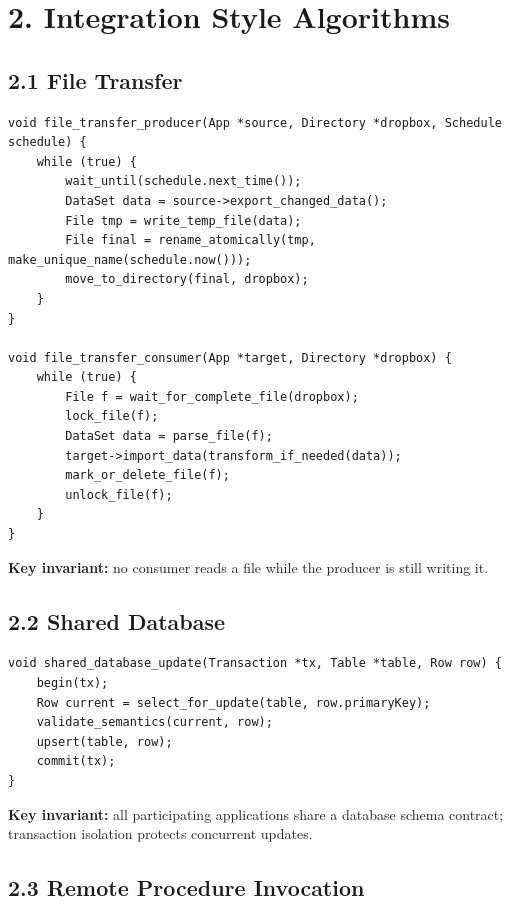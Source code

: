 \documentclass[11pt]{article}
\begin{document}
\section{2. Integration Style
Algorithms}\label{integration-style-algorithms}

\subsection{2.1 File Transfer}\label{file-transfer}

\begin{verbatim}
void file_transfer_producer(App *source, Directory *dropbox, Schedule schedule) {
    while (true) {
        wait_until(schedule.next_time());
        DataSet data = source->export_changed_data();
        File tmp = write_temp_file(data);
        File final = rename_atomically(tmp, make_unique_name(schedule.now()));
        move_to_directory(final, dropbox);
    }
}

void file_transfer_consumer(App *target, Directory *dropbox) {
    while (true) {
        File f = wait_for_complete_file(dropbox);
        lock_file(f);
        DataSet data = parse_file(f);
        target->import_data(transform_if_needed(data));
        mark_or_delete_file(f);
        unlock_file(f);
    }
}
\end{verbatim}

\textbf{Key invariant:} no consumer reads a file while the producer is
still writing it.

\subsection{2.2 Shared Database}\label{shared-database}

\begin{verbatim}
void shared_database_update(Transaction *tx, Table *table, Row row) {
    begin(tx);
    Row current = select_for_update(table, row.primaryKey);
    validate_semantics(current, row);
    upsert(table, row);
    commit(tx);
}
\end{verbatim}

\textbf{Key invariant:} all participating applications share a database
schema contract; transaction isolation protects concurrent updates.

\subsection{2.3 Remote Procedure
Invocation}\label{remote-procedure-invocation}
\end{document}
